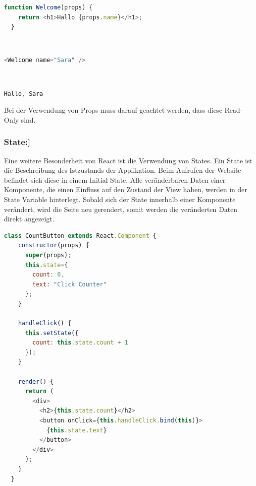 \begin{lstlisting}[language=JavaScript, caption=Komponente 'Welcome' die Props 'props' erwartet, label=lst:impl:componentWelcome]
  function Welcome(props) {
    return <h1>Hallo {props.name}</h1>;
  }
\end{lstlisting}\cite{PropsAndComponents} \\
 
\begin{lstlisting}[language=JavaScript, caption=Aufruf der Komponente 'Welcome' mit Übergabe des props 'name', label=lst:impl:UebergabeName]
  <Welcome name="Sara" />
\end{lstlisting}\cite{PropsAndComponents} \\
 
\begin{lstlisting}[language=JavaScript, caption=Ausgabe der Komponente 'Welcome', label=lst:impl:ausgabeComponentWelcome]
  Hallo, Sara
\end{lstlisting}

Bei der Verwendung von Props muss darauf geachtet werden, dass diese Read-Only sind.
\cite{PropsAndComponents2}

\subsubsection{State:]}
Eine weitere Besonderheit von React ist die Verwendung von States. Ein State ist die Beschreibung des Istzustands der Applikation. Beim Aufrufen der Website befindet sich diese in einem Initial State. Alle veränderbaren Daten einer Komponente, die einen Einfluss auf den Zustand der View haben, werden in der State Variable hinterlegt.
Sobald sich der State innerhalb einer Komponente verändert, wird die Seite neu gerendert, somit werden die veränderten Daten direkt angezeigt.
\cite{T3NReact} \\
 
\begin{lstlisting}[language=JavaScript, caption=Beispiel Code eines Click Counters mit der Nutzung on States, label=lst:impl:CountButton]
  class CountButton extends React.Component {
    constructor(props) {
      super(props);
      this.state={
        count: 0,
        text: "Click Counter"
      };
    }

    handleClick() {
      this.setState({
        count: this.state.count + 1
      });
    }

    render() {
      return (
        <div>
          <h2>{this.state.count}</h2>
          <button onClick={this.handleClick.bind(this)}>
            {this.state.text}
          </button>
        </div>
      );
    }
  }
\end{lstlisting} \cite{CountButtonExampleCode}

